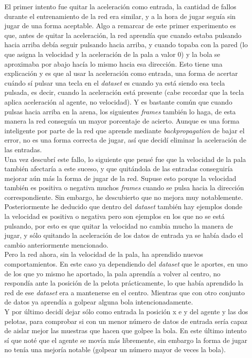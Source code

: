 El primer intento fue quitar la aceleración como entrada, la cantidad de fallos durante el entrenamiento de la red era similar, y a la hora de jugar seguía sin jugar de una forma aceptable. Algo a remarcar de este primer experimento es que, antes de quitar la aceleración, la red aprendía que cuando estaba pulsando hacia arriba debía seguir pulsando hacia arriba, y cuando topaba con la pared (lo que asigna la velocidad y la aceleración de la pala a valor 0) y la bola se aproximaba por abajo hacía lo mismo hacia esa dirección. Esto tiene una explicación y es que al usar la aceleración como entrada, una forma de acertar cuándo sí pulsar una tecla en el \textit{dataset} es cuando ya está siendo esa tecla pulsada, es decir, cuando la aceleración está presente (cabe recordar que la tecla aplica aceleración al agente, no velocidad). Y es bastante común que cuando pulsas hacia arriba en la arena, los siguientes \textit{frames} también lo haga, de esta manera la red conseguía un mayor porcentaje de acierto. Aunque es una forma inteligente por parte de la red que aprende mediante \textit{backpropagation} de bajar el error, no es una forma correcta de jugar, así que decidí eliminar la aceleración de las entradas.
\\
Una vez descubrí este fallo, lo siguiente que pensé fue que la velocidad de la pala también afectaría a este suceso, y que quitándola de las entradas conseguiría mejorar aún más la forma de jugar de la red. Supuse esto porque la velocidad también es positiva o negativa muchos \textit{frames} cuando se pulsa hacia la dirección correspondiente. Sin embargo, he descubierto que no mejora muy notablemente. Posteriormente he deducido que dentro del \textit{dataset} también hay ejemplos donde la velocidad es positiva o negativa pero son ejemplos en los que no se está pulsando, por esto es que quitar la velocidad no cambia mucho la manera de jugar, y sólo quitando la aceleración de los datos de entrada ya se había dado el cambio anteriormente mencionado.
\\
Pero la red ahora, sin la velocidad de la pala, ha aprendido nuevos comportamientos. En este caso ya dependiendo del \textit{dataset} que le aportes, en uno de los que yo mismo he aportado, la pala aprendía a volver al centro, no respondía ante la posición de la pelota prácticamente, lo que había aprendido la red de ese \textit{dataset} era a mantenerse en el centro. Mientras que con otro conjunto de datos ya aprendía a golpear alguna bola intencionadamente.
\\
Y por último decidí dejar sólo como entrada la posición x e y del agente y las dos pelotas, para comprobar si con un menor número de datos de entrada sería capaz de aislar mejor las muestras que hacen que golpee la bola. En este último intento sí que noté que el agente se movía más libremente, sin embargo la forma de jugar no tenía una mejoría notable (golpear un número mayor de veces la bola).

